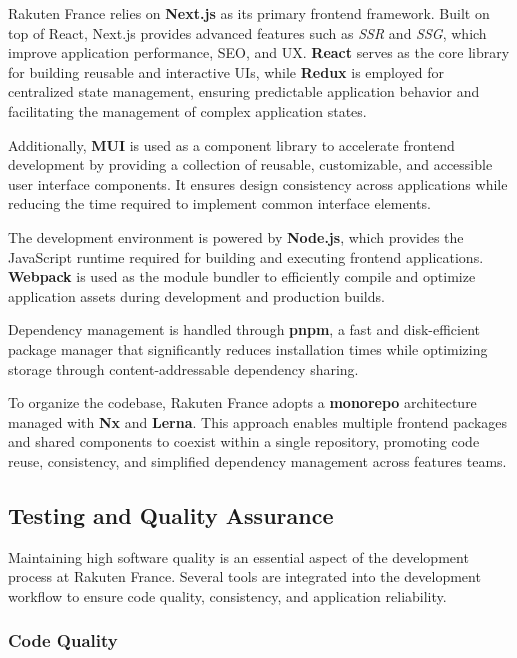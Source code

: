 Rakuten France relies on \textbf{Next.js} as its primary frontend framework. Built on top of React, Next.js provides advanced features such as \textit{\ac{SSR}} and \textit{\ac{SSG}}, which improve application performance, \ac{SEO}, and \ac{UX}. \textbf{React} serves as the core library for building reusable and interactive \ac{UI}s, while \textbf{Redux} is employed for centralized state management, ensuring predictable application behavior and facilitating the management of complex application states.

Additionally, \textbf{\ac{MUI}} is used as a component library to accelerate frontend development by providing a collection of reusable, customizable, and accessible user interface components. It ensures design consistency across applications while reducing the time required to implement common interface elements.

The development environment is powered by \textbf{Node.js}, which provides the JavaScript runtime required for building and executing frontend applications. \textbf{Webpack} is used as the module bundler to efficiently compile and optimize application assets during development and production builds.

Dependency management is handled through \textbf{pnpm}, a fast and disk-efficient package manager that significantly reduces installation times while optimizing storage through content-addressable dependency sharing.

To organize the codebase, Rakuten France adopts a \textbf{monorepo} architecture managed with \textbf{Nx} and \textbf{Lerna}. This approach enables multiple frontend packages and shared components to coexist within a single repository, promoting code reuse, consistency, and simplified dependency management across features teams.

\subsection{Testing and Quality Assurance}

Maintaining high software quality is an essential aspect of the development process at Rakuten France. Several tools are integrated into the development workflow to ensure code quality, consistency, and application reliability.

\subsubsection{Code Quality}

